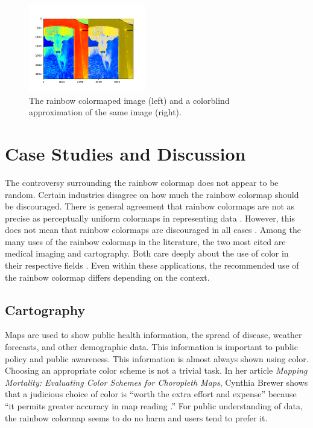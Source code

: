 \documentclass[journal,12pt]{IEEEtran}
\begin{document}
\begin{figure}
\centering
\includegraphics[width=2in]{colorblind_rainbow1.png}%
\caption{The rainbow colormaped image (left) and a colorblind approximation of the same image (right).}
\end{figure}

\section{Case Studies and Discussion}

The controversy surrounding the rainbow colormap does not appear to be random.
Certain industries disagree on how much the rainbow colormap should be 
discouraged. There is general agreement that rainbow colormaps are not as 
precise as perceptually uniform colormaps in representing data 
\cite{colorvblackwhite}. However, this 
does not mean that rainbow colormaps are discouraged in all cases
 \cite{spectralschemes}. 
Among the many uses of the rainbow colormap in the
literature, the two most cited are
medical imaging and cartography. Both care deeply about the use of color in 
their respective fields \cite{colorguidelines, standardmedimg}. Even within
 these applications, the recommended use of the rainbow colormap differs
 depending on the context.
 
\subsection{Cartography}

Maps are used to show public health information, the spread of disease, weather
forecasts, and other demographic data. This information is important to
 public policy and public awareness. This information is almost always shown
 using color. Choosing an appropriate color scheme is not a trivial task. In her
article \textit{Mapping Mortality: Evaluating Color Schemes for Choropleth
Maps}, Cynthia Brewer shows that a judicious choice of color is ``worth 
the extra effort and expense'' because ``it permits greater accuracy in map
reading \cite{choropleth}.'' For public understanding of data, the rainbow colormap
seems to do no harm and users tend to prefer it.
\end{document}

